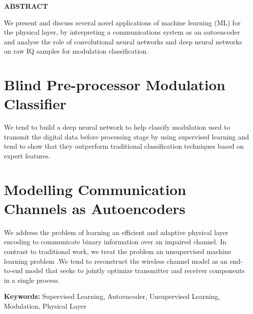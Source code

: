 \begin{center}
\thispagestyle{empty}
\vspace{2cm}
\LARGE{\textbf{ABSTRACT}}\\[1.0cm]
\end{center}
\thispagestyle{empty}
\Large{}We present and discuss several novel applications of machine learning (ML) for the physical layer, by interpreting a communications system as an autoencoder and analyse the role of convolutional neural networks and deep neural networks on raw IQ samples for modulation classification.
\section*{Blind Pre-processor Modulation Classifier}
We tend to build a deep neural network to help classify modulation used to transmit the digital data before processing stage by using supervised learning and tend to show that they  outperform traditional classification techniques based on expert features. 
\vspace{-1cm}
\Large{}\paragraph{}
\section*{Modelling Communication Channels as Autoencoders}
\Large{}\paragraph{} We address the problem of learning an efficient and adaptive physical layer encoding to communicate binary information over an impaired channel. In contrast to traditional work, we treat the problem an unsupervised machine learning problem .We tend to reconstruct the wireless channel model as an end-to-end model that seeks to jointly optimize transmitter and receiver components in a single process.

\vspace{1cm}
\textbf{Keywords:} {Supervised Learning, Autoencoder, Unsupervised Learning, Modulation, Physical Layer }